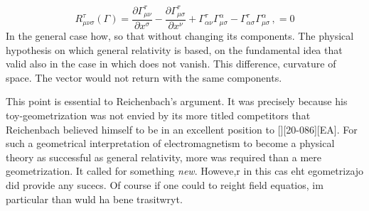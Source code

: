 \begin{equation}\label{eq:riemanntensorgamma}
R_{\mu \nu \sigma}^{\tau}(\Gamma)=\frac{\partial \Gamma_{\mu \nu}^{\tau}}{\partial x^{\sigma}}-\frac{\partial \Gamma_{\mu \sigma}^{\tau}}{\partial x^{\nu}}+\Gamma_{\alpha \nu}^{\tau} \Gamma_{\mu \sigma}^{\alpha}-\Gamma_{\alpha \sigma}^{\tau} \Gamma_{\mu\sigma}^{\alpha}\,, = 0
\end{equation}
%
In the general case how, so that without changing its components. The physical hypothesis on which general relativity is based, on the fundamental idea that valid also in the case in which does not vanish. This difference, curvature of space. The vector would not return with the same components.

This point is essential to Reichenbach's argument. It was precisely because his toy-geometrization was not envied by its more titled competitors that Reichenbach believed himself to be in an excellent position to [][20-086][EA]. For such a geometrical interpretation of electromagnetism to become a physical theory as successful as general relativity, more was required than a mere geometrization. It called for something \emph{new}. Howeve,r in this cas eht egometrizajo did provide any sucecs. Of course if one could to reight field equatios, im particular than wuld ha bene trasitwryt.


